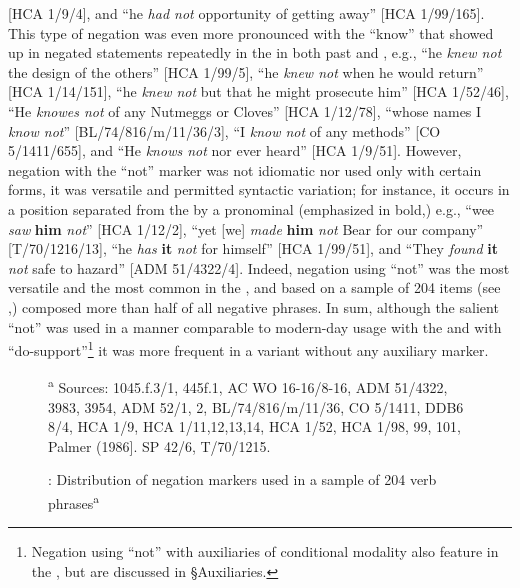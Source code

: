 [HCA 1/9/4], and “he \textit{had not} opportunity of getting away” [HCA 1/99/165]. This type of negation was even more pronounced with the  “know” that showed up in negated statements repeatedly in the  in both past and , e.g., “he \textit{knew not} the design of the others” [HCA 1/99/5], “he \textit{knew not} when he would return” [HCA 1/14/151], “he \textit{knew not} but that he might prosecute him” [HCA 1/52/46], “He \textit{knowes not} of any Nutmeggs or Cloves” [HCA 1/12/78], “whose names I \textit{know not}” [BL/74/816/m/11/36/3], “I \textit{know not} of any methods” [CO 5/1411/655], and “He \textit{knows not} nor ever heard” [HCA 1/9/51]. However, negation with the “not” marker was not idiomatic nor used only with certain  forms, it was versatile and permitted syntactic variation; for instance, it occurs in a position separated from the  by a pronominal  (emphasized in bold,) e.g., “wee \textit{saw}\textbf{ }\textbf{him} \textit{not}” [HCA 1/12/2], “yet [we] \textit{made} \textbf{him} \textit{not} Bear for our company” [T/70/1216/13], “he \textit{has} \textbf{it} \textit{not} for himself” [HCA 1/99/51], and “They \textit{found} \textbf{it} \textit{not} safe to hazard” [ADM 51/4322/4]. Indeed, negation using “not” was the most versatile and the most common  in the , and based on a sample of 204 items (see ,) composed more than half of all negative  phrases. In sum, although the salient “not”  was used in a manner comparable to modern-day usage with the  and with “do-support”\footnote{Negation using “not” with auxiliaries of conditional modality also feature in the , but are discussed in §Auxiliaries.} it was more frequent in a variant  without any auxiliary marker.

  
\begin{figure}


\caption{\label{fig:key:6.1}: Distribution of negation markers used in a sample of 204 verb phrases\textsuperscript{a} }

\textsuperscript{a} Sources: 1045.f.3/1, 445f.1, AC WO 16-16/8-16, ADM 51/4322, 3983, 3954, ADM 52/1, 2, BL/74/816/m/11/36, CO 5/1411, DDB6 8/4, HCA 1/9, HCA 1/11,12,13,14, HCA 1/52, HCA 1/98, 99, 101, Palmer (1986]. SP 42/6, T/70/1215.
\end{figure}


